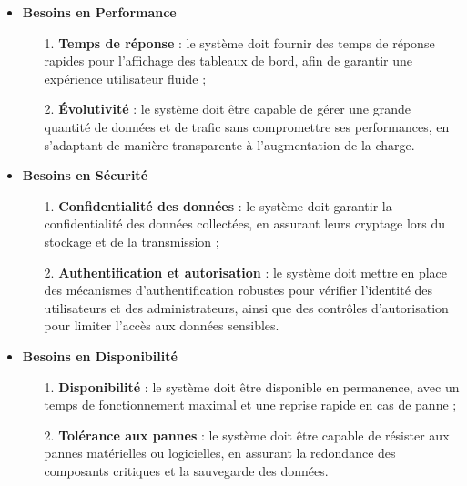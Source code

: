   \begin{itemize}
        \item\textbf{Besoins en Performance}

                \begin{enumerate}
                    \item[1.] \textbf{Temps de réponse} : le système doit fournir des temps de réponse rapides pour l'affichage des tableaux de bord, afin de garantir une expérience utilisateur fluide ;
                    
                    \item[2.] \textbf{Évolutivité} : le système doit être capable de gérer une grande quantité de données et de trafic sans compromettre ses performances, en s'adaptant de manière transparente à l'augmentation de la charge.
                \end{enumerate}
    
        \item\textbf{Besoins en Sécurité}
    
                \begin{enumerate}
                    \item[1.] \textbf{Confidentialité des données} : le système doit garantir la confidentialité des données collectées, en assurant leurs cryptage lors du stockage et de la transmission ;
                    
                    \item[2.] \textbf{Authentification et autorisation} : le système doit mettre en place des mécanismes d'authentification robustes pour vérifier l'identité des utilisateurs 
                    et des administrateurs, ainsi que des contrôles d'autorisation pour limiter l'accès aux données sensibles.
                \end{enumerate}
    
        \item\textbf{Besoins en Disponibilité}
    
                \begin{enumerate}
                    \item[1.] \textbf{Disponibilité} : le système doit être disponible en permanence, avec un temps de fonctionnement maximal et une reprise rapide en cas de panne ;
                    
                    \item[2.] \textbf{Tolérance aux pannes} : le système doit être capable de résister aux pannes matérielles ou logicielles, en assurant la redondance des composants critiques et la sauvegarde des données.
                \end{enumerate}
    

\end{itemize}
